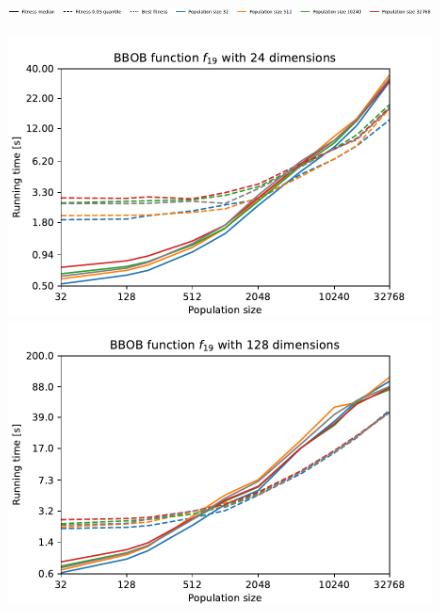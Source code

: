 \begin{figure}[ht!]
    \begin{minipage}{\textwidth}
        \centering
        \includegraphics[width=\textwidth]{img/runs/fitness_es_mutation_legend.pdf}
    \end{minipage}

    \caption[Real--coded mutation fitness over generations]{}
\end{figure}



\begin{figure}[ht!]
    \begin{minipage}[t]{0.32\textwidth}
        \centering
        \includegraphics[width=\textwidth]{img/runs/time_es_crossover_fn19_24d.pdf}
    \end{minipage}
    \hfill
    \begin{minipage}[t]{0.32\textwidth}
        \centering
        \includegraphics[width=\textwidth]{img/runs/time_es_crossover_fn19_128d.pdf}

\end{minipage}
\end{figure}

